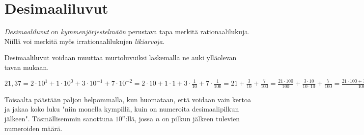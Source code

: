 \section{Desimaaliluvut}

\emph{Desimaaliluvut} on \emph{kymmenjärjestelmään} perustava tapa merkitä rationaalilukuja. Niillä voi merkitä myös irrationaalilukujen \emph{likiarvoja}.


Desimaaliluvut voidaan muuttaa murtoluvuiksi laskemalla ne auki ylläolevan tavan mukaan.

\begin{esimerkki}
$21,37 = 2 \cdot 10^1 + 1 \cdot 10^0 + 3 \cdot 10^{-1} + 7 \cdot 10^{-2} = 2 \cdot 10 + 1 \cdot 1 + 3 \cdot \frac{1}{10} + 7 \cdot \frac{1}{100} = 21 + \frac{3}{10} + \frac{7}{100} = \frac{21 \cdot 100}{100} + \frac{3 \cdot 10}{10 \cdot 10} + \frac{7}{100} = \frac{21 \cdot 100 + 3 \cdot 10 + 7}{100} = \frac{2100+30+7}{100} = \frac{2137}{100}$
\end{esimerkki}

Toisaalta päästään paljon helpommalla, kun huomataan, että voidaan vain kertoa ja jakaa koko luku "niin monella kympillä, kuin on numeroita desimaalipilkun jälkeen". Täsmällisemmin sanottuna $10^n$:llä, jossa $n$ on pilkun jälkeen tulevien numeroiden määrä.

\begin{esimerkki}
\end{esimerkki}